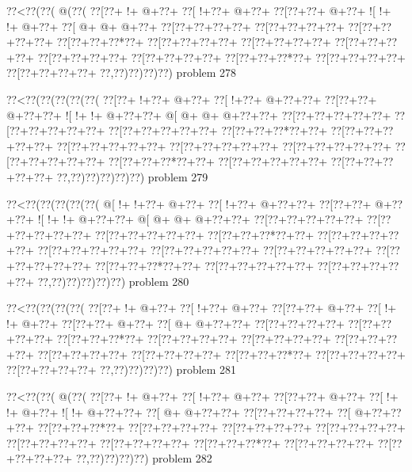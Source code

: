 \vbox{\vbox{\goo
\0??<\0??(\0??(\- @(\0??(
\0??[\0??+\- !+\- @+\0??+
\0??[\- !+\0??+\- @+\0??+
\0??[\0??+\0??+\- @+\0??+
\- ![\- !+\- !+\- @+\0??+
\0??[\- @+\- @+\- @+\0??+
\0??[\0??+\0??+\0??+\0??+
\0??[\0??+\0??+\0??+\0??+
\0??[\0??+\0??+\0??+\0??+
\0??[\0??+\0??+\0??*\0??+
\0??[\0??+\0??+\0??+\0??+
\0??[\0??+\0??+\0??+\0??+
\0??[\0??+\0??+\0??+\0??+
\0??[\0??+\0??+\0??+\0??+
\0??[\0??+\0??+\0??+\0??+
\0??[\0??+\0??+\0??*\0??+
\0??[\0??+\0??+\0??+\0??+
\0??[\0??+\0??+\0??+\0??+
\0??,\0??)\0??)\0??)\0??)
}
\hfil problem 278\hfil\break
}

\vbox{\vbox{\goo
\0??<\0??(\0??(\0??(\0??(\0??(
\0??[\0??+\- !+\0??+\- @+\0??+
\0??[\- !+\0??+\- @+\0??+\0??+
\0??[\0??+\0??+\- @+\0??+\0??+
\- ![\- !+\- !+\- @+\0??+\0??+
\- @[\- @+\- @+\- @+\0??+\0??+
\0??[\0??+\0??+\0??+\0??+\0??+
\0??[\0??+\0??+\0??+\0??+\0??+
\0??[\0??+\0??+\0??+\0??+\0??+
\0??[\0??+\0??+\0??*\0??+\0??+
\0??[\0??+\0??+\0??+\0??+\0??+
\0??[\0??+\0??+\0??+\0??+\0??+
\0??[\0??+\0??+\0??+\0??+\0??+
\0??[\0??+\0??+\0??+\0??+\0??+
\0??[\0??+\0??+\0??+\0??+\0??+
\0??[\0??+\0??+\0??*\0??+\0??+
\0??[\0??+\0??+\0??+\0??+\0??+
\0??[\0??+\0??+\0??+\0??+\0??+
\0??,\0??)\0??)\0??)\0??)\0??)
}
\hfil problem 279\hfil\break
}

\vbox{\vbox{\goo
\0??<\0??(\0??(\0??(\0??(\0??(
\- @[\- !+\- !+\0??+\- @+\0??+
\0??[\- !+\0??+\- @+\0??+\0??+
\0??[\0??+\0??+\- @+\0??+\0??+
\- ![\- !+\- !+\- @+\0??+\0??+
\- @[\- @+\- @+\- @+\0??+\0??+
\0??[\0??+\0??+\0??+\0??+\0??+
\0??[\0??+\0??+\0??+\0??+\0??+
\0??[\0??+\0??+\0??+\0??+\0??+
\0??[\0??+\0??+\0??*\0??+\0??+
\0??[\0??+\0??+\0??+\0??+\0??+
\0??[\0??+\0??+\0??+\0??+\0??+
\0??[\0??+\0??+\0??+\0??+\0??+
\0??[\0??+\0??+\0??+\0??+\0??+
\0??[\0??+\0??+\0??+\0??+\0??+
\0??[\0??+\0??+\0??*\0??+\0??+
\0??[\0??+\0??+\0??+\0??+\0??+
\0??[\0??+\0??+\0??+\0??+\0??+
\0??,\0??)\0??)\0??)\0??)\0??)
}
\hfil problem 280\hfil\break
}

\vbox{\vbox{\goo
\0??<\0??(\0??(\0??(\0??(
\0??[\0??+\- !+\- @+\0??+
\0??[\- !+\0??+\- @+\0??+
\0??[\0??+\0??+\- @+\0??+
\0??[\- !+\- !+\- @+\0??+
\0??[\0??+\0??+\- @+\0??+
\0??[\- @+\- @+\0??+\0??+
\0??[\0??+\0??+\0??+\0??+
\0??[\0??+\0??+\0??+\0??+
\0??[\0??+\0??+\0??*\0??+
\0??[\0??+\0??+\0??+\0??+
\0??[\0??+\0??+\0??+\0??+
\0??[\0??+\0??+\0??+\0??+
\0??[\0??+\0??+\0??+\0??+
\0??[\0??+\0??+\0??+\0??+
\0??[\0??+\0??+\0??*\0??+
\0??[\0??+\0??+\0??+\0??+
\0??[\0??+\0??+\0??+\0??+
\0??,\0??)\0??)\0??)\0??)
}
\hfil problem 281\hfil\break
}

\vbox{\vbox{\goo
\0??<\0??(\0??(\- @(\0??(
\0??[\0??+\- !+\- @+\0??+
\0??[\- !+\0??+\- @+\0??+
\0??[\0??+\0??+\- @+\0??+
\0??[\- !+\- !+\- @+\0??+
\- ![\- !+\- @+\0??+\0??+
\0??[\- @+\- @+\0??+\0??+
\0??[\0??+\0??+\0??+\0??+
\0??[\- @+\0??+\0??+\0??+
\0??[\0??+\0??+\0??*\0??+
\0??[\0??+\0??+\0??+\0??+
\0??[\0??+\0??+\0??+\0??+
\0??[\0??+\0??+\0??+\0??+
\0??[\0??+\0??+\0??+\0??+
\0??[\0??+\0??+\0??+\0??+
\0??[\0??+\0??+\0??*\0??+
\0??[\0??+\0??+\0??+\0??+
\0??[\0??+\0??+\0??+\0??+
\0??,\0??)\0??)\0??)\0??)
}
\hfil problem 282\hfil\break
}

